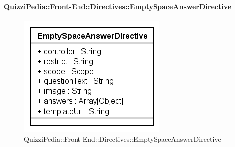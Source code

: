 	\paragraph{QuizziPedia::Front-End::Directives::EmptySpaceAnswerDirective}
		
		\label{QuizziPedia::Front-End::Directives::EmptySpaceAnswerDirective}
		
		\begin{figure}[ht]
			\centering
			\includegraphics[scale=0.80,keepaspectratio]{UML/Classi/Front-End/QuizziPedia_Front-end_Templates_EmptySpaceAnswerTemplate.png}
			\caption{QuizziPedia::Front-End::Directives::EmptySpaceAnswerDirective}
		\end{figure} \FloatBarrier
		
